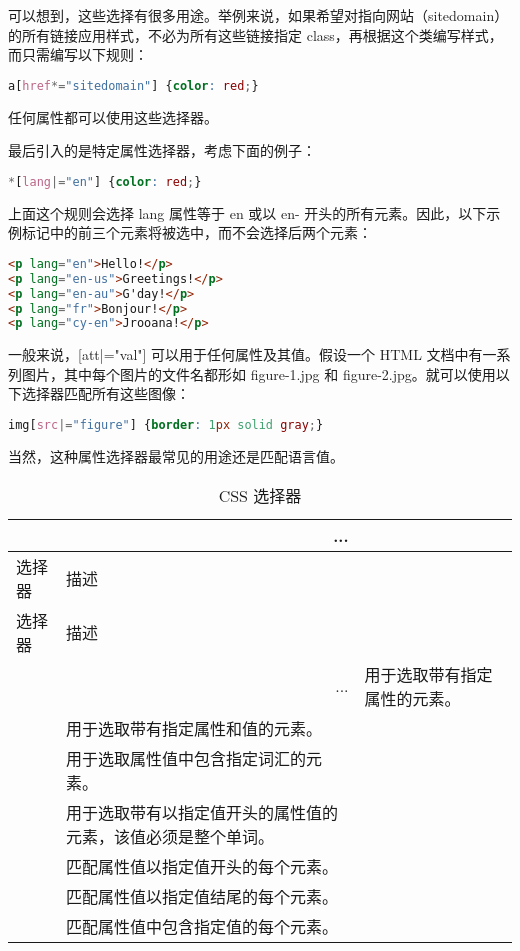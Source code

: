 可以想到，这些选择有很多用途。举例来说，如果希望对指向网站（sitedomain）的所有链接应用样式，不必为所有这些链接指定 class，再根据这个类编写样式，而只需编写以下规则：

\begin{lstlisting}[language=CSS]
a[href*="sitedomain"] {color: red;}
\end{lstlisting}


任何属性都可以使用这些选择器。


最后引入的是特定属性选择器，考虑下面的例子：

\begin{lstlisting}[language=CSS]
*[lang|="en"] {color: red;}
\end{lstlisting}

上面这个规则会选择 lang 属性等于 en 或以 en- 开头的所有元素。因此，以下示例标记中的前三个元素将被选中，而不会选择后两个元素：

\begin{lstlisting}[language=HTML]
<p lang="en">Hello!</p>
<p lang="en-us">Greetings!</p>
<p lang="en-au">G'day!</p>
<p lang="fr">Bonjour!</p>
<p lang="cy-en">Jrooana!</p>
\end{lstlisting}

一般来说，[att|="val"] 可以用于任何属性及其值。假设一个 HTML 文档中有一系列图片，其中每个图片的文件名都形如 figure-1.jpg 和 figure-2.jpg。就可以使用以下选择器匹配所有这些图像：

\begin{lstlisting}[language=CSS]
img[src|="figure"] {border: 1px solid gray;}
\end{lstlisting}

当然，这种属性选择器最常见的用途还是匹配语言值。

\begin{longtable}{|p{80pt}|p{200pt}|}
\multicolumn{2}{r}{...}
\tabularnewline\hline
选择器	&	描述
\endhead

\caption{CSS 选择器}\\
\hline
选择器	&描述
\tabularnewline\hline
\endfirsthead


\multicolumn{2}{r}{...}
\endfoot

\endlastfoot

\hline
[attribute]		&用于选取带有指定属性的元素。\\
\hline
[attribute=value]	&用于选取带有指定属性和值的元素。\\
\hline
[attribute~=value]	&用于选取属性值中包含指定词汇的元素。\\
\hline
[attribute|=value]	&用于选取带有以指定值开头的属性值的元素，该值必须是整个单词。\\
\hline
[attribute\^{}=value]	&匹配属性值以指定值开头的每个元素。\\
\hline
[attribute\$=value]	&匹配属性值以指定值结尾的每个元素。\\
\hline
[attribute*=value]	&匹配属性值中包含指定值的每个元素。\\
\hline


\end{longtable}





